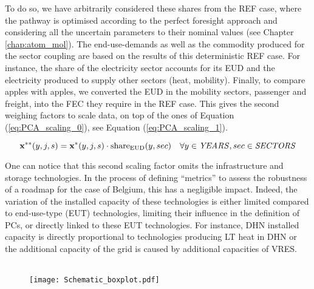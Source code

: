 To do so, we have arbitrarily considered these shares from the REF case, where the pathway is optimised according to the perfect foresight approach and considering all the uncertain parameters to their nominal values (see Chapter \ref{chap:atom_mol}).  The end-use-demands as well as the commodity produced for the sector coupling are based on the results of this deterministic REF case.  For instance, the share of the electricity sector accounts for its \gls{EUD} and the electricity produced to supply other sectors (\eg heat, mobility). Finally, to compare apples with apples, we converted the \gls{EUD} in the mobility sectors, \ie passenger and freight, into the \gls{FEC} they require in the REF case. This gives the second weighing factors to scale data, on top of the ones of Equation (\ref{eq:PCA_scaling_0}), see Equation (\ref{eq:PCA_scaling_1}).

\begin{equation}
 \label{eq:PCA_scaling_1}
\textbf{x}^{**}(y,j,s)=\textbf{x}^{*}(y,j,s)\cdot \text{share}_{\text{EUD}}(y,sec)
 \quad \forall y \in \text{\emph{YEARS}}, sec \in \text{\emph{SECTORS}}
\end{equation}

One can notice that this second scaling factor omits the infrastructure and storage technologies. In the process of defining ``metrics'' to assess the robustness of a roadmap for the case of Belgium, this has a negligible impact. Indeed, the variation of the installed capacity of these technologies is either limited compared to end-use-type (EUT) technologies, \ie limiting their influence in the definition of PCs, or directly linked to these EUT technologies. For instance, \gls{DHN} installed capacity is directly proportional to technologies producing \gls{LT} heat in \gls{DHN} or the additional capacity of the grid is caused by additional capacities of \gls{VRES}. \\

\\

\begin{wrapfigure}{r}{3cm}
\centering
\captionsetup{justification=centering}
\texttt{[image: Schematic\_boxplot.pdf]}
\caption{}
\label{fig:Schematic_boxplot_methodo}
\end{wrapfigure}

